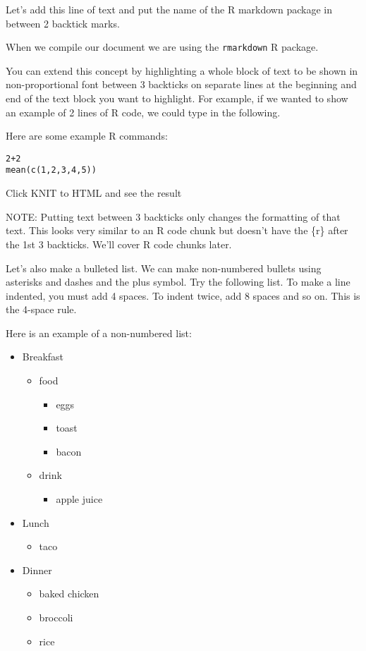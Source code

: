 \documentclass[]{book}
\providecommand{\tightlist}{%
  \setlength{\itemsep}{0pt}\setlength{\parskip}{0pt}}
\theoremstyle{definition}
\theoremstyle{definition}
\theoremstyle{definition}
\theoremstyle{remark}
\begin{document}
Let's add this line of text and put the name of the R markdown package
in between 2 backtick marks.

When we compile our document we are using the \texttt{rmarkdown} R
package.

You can extend this concept by highlighting a whole block of text to be
shown in non-proportional font between 3 backticks on separate lines at
the beginning and end of the text block you want to highlight. For
example, if we wanted to show an example of 2 lines of R code, we could
type in the following.

Here are some example R commands:

\begin{verbatim}
2+2
mean(c(1,2,3,4,5))
\end{verbatim}

Click KNIT to HTML and see the result

NOTE: Putting text between 3 backticks only changes the formatting of
that text. This looks very similar to an R code chunk but doesn't have
the \{r\} after the 1st 3 backticks. We'll cover R code chunks later.

Let's also make a bulleted list. We can make non-numbered bullets using
asterisks and dashes and the plus symbol. Try the following list. To
make a line indented, you must add 4 spaces. To indent twice, add 8
spaces and so on. This is the 4-space rule.

Here is an example of a non-numbered list:

\begin{itemize}
\tightlist
\item
  Breakfast

  \begin{itemize}
  \tightlist
  \item
    food

    \begin{itemize}
    \tightlist
    \item
      eggs
    \item
      toast
    \item
      bacon
    \end{itemize}
  \item
    drink

    \begin{itemize}
    \tightlist
    \item
      apple juice
    \end{itemize}
  \end{itemize}
\item
  Lunch

  \begin{itemize}
  \tightlist
  \item
    taco
  \end{itemize}
\item
  Dinner

  \begin{itemize}
  \tightlist
  \item
    baked chicken
  \item
    broccoli
  \item
    rice
  \end{itemize}
\end{itemize}
\end{document}

